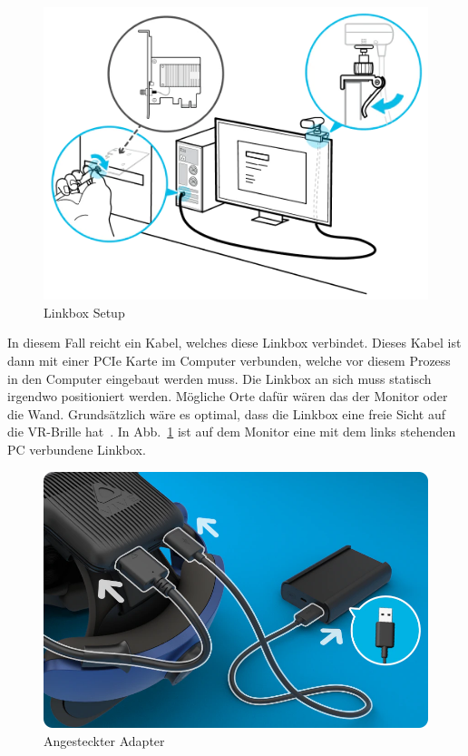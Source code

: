 \begin{figure}
    \centering
    \includegraphics[scale=0.5]{pics/vive-wireless-setup-linkbox}
    \caption{Linkbox Setup~\cite{Wireless_Adapter_Setup_Docs}}
    \label{fig:vive-wireless-setup-linkbox}
\end{figure}


In diesem Fall reicht ein Kabel, welches diese Linkbox verbindet.
Dieses Kabel ist dann mit einer PCIe Karte im Computer verbunden, welche vor diesem Prozess in den Computer eingebaut werden muss.
Die Linkbox an sich muss statisch irgendwo positioniert werden.
Mögliche Orte dafür wären das der Monitor oder die Wand.
Grundsätzlich wäre es optimal, dass die Linkbox eine freie Sicht auf die VR-Brille hat~\cite{Wireless_Adapter_Setup_Docs}.
In Abb.~\ref{fig:vive-wireless-setup-linkbox} ist auf dem Monitor eine mit dem links stehenden PC verbundene Linkbox.

\begin{figure}
    \centering
    \includegraphics[scale=0.3]{pics/vive-wireless-setup-adapter}
    \caption{Angesteckter Adapter~\cite{Wireless_Adapter_Setup_Page}}
    \label{fig:vive-wireless-setup-adapter}
\end{figure}


